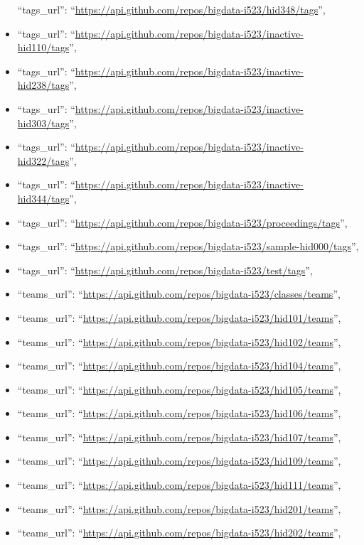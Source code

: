 \begin{itemize}
  ``tags\_url'':
  ``\url{https://api.github.com/repos/bigdata-i523/hid348/tags}'',
\item
  ``tags\_url'':
  ``\url{https://api.github.com/repos/bigdata-i523/inactive-hid110/tags}'',
\item
  ``tags\_url'':
  ``\url{https://api.github.com/repos/bigdata-i523/inactive-hid238/tags}'',
\item
  ``tags\_url'':
  ``\url{https://api.github.com/repos/bigdata-i523/inactive-hid303/tags}'',
\item
  ``tags\_url'':
  ``\url{https://api.github.com/repos/bigdata-i523/inactive-hid322/tags}'',
\item
  ``tags\_url'':
  ``\url{https://api.github.com/repos/bigdata-i523/inactive-hid344/tags}'',
\item
  ``tags\_url'':
  ``\url{https://api.github.com/repos/bigdata-i523/proceedings/tags}'',
\item
  ``tags\_url'':
  ``\url{https://api.github.com/repos/bigdata-i523/sample-hid000/tags}'',
\item
  ``tags\_url'':
  ``\url{https://api.github.com/repos/bigdata-i523/test/tags}'',
\item
  ``teams\_url'':
  ``\url{https://api.github.com/repos/bigdata-i523/classes/teams}'',
\item
  ``teams\_url'':
  ``\url{https://api.github.com/repos/bigdata-i523/hid101/teams}'',
\item
  ``teams\_url'':
  ``\url{https://api.github.com/repos/bigdata-i523/hid102/teams}'',
\item
  ``teams\_url'':
  ``\url{https://api.github.com/repos/bigdata-i523/hid104/teams}'',
\item
  ``teams\_url'':
  ``\url{https://api.github.com/repos/bigdata-i523/hid105/teams}'',
\item
  ``teams\_url'':
  ``\url{https://api.github.com/repos/bigdata-i523/hid106/teams}'',
\item
  ``teams\_url'':
  ``\url{https://api.github.com/repos/bigdata-i523/hid107/teams}'',
\item
  ``teams\_url'':
  ``\url{https://api.github.com/repos/bigdata-i523/hid109/teams}'',
\item
  ``teams\_url'':
  ``\url{https://api.github.com/repos/bigdata-i523/hid111/teams}'',
\item
  ``teams\_url'':
  ``\url{https://api.github.com/repos/bigdata-i523/hid201/teams}'',
\item
  ``teams\_url'':
  ``\url{https://api.github.com/repos/bigdata-i523/hid202/teams}'',

\end{itemize}

